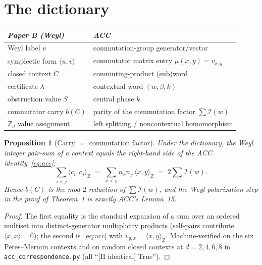\documentclass[11pt]{article}
\newtheorem{proposition}[theorem]{Proposition}
\newcommand{\Z}{\mathbb{Z}}
\newcommand{\ip}[2]{\langle #1,#2\rangle}
\begin{document}
\section{The dictionary}
\begin{center}
\begin{tabular}{ll}
\hline
\emph{Paper B (Weyl)} & \emph{ACC~\cite{ACC24}}\\
\hline
Weyl label $v$ & commutation-group generator/vector\\
symplectic form $\ip{u}{v}$ & commutator matrix entry $\mu(x,y)=v_{x,y}$\\
closed context $C$ & commuting-product (sub)word\\
certificate $\lambda$ & contextual word $(w,\beta,k)$\\
obstruction value $S$ & central phase $k$\\
commutator carry $b(C)$ & parity of the commutation factor $\sum\mathcal I(w)$\\
$\Z_d$ value assignment & left splitting / noncontextual homomorphism\\
\hline
\end{tabular}
\end{center}

\begin{proposition}[Carry $=$ commutation factor]\label{prop:carry}
Under the dictionary, the Weyl integer pair-sum of a context equals the right-hand side of the ACC
identity~\eqref{eq:acc}:
\[
\sum_{i<j}\ip{c_i}{c_j}_{\Z}\;=\;\sum_{x<y}n_x n_y\,\ip{x}{y}_{\Z}\;=\;2\sum\mathcal I(w).
\]
Hence $b(C)$ is the mod-$2$ reduction of $\sum\mathcal I(w)$, and the Weyl polarization step in the
proof of Theorem~1 is exactly ACC's Lemma~15.
\end{proposition}
\begin{proof}
The first equality is the standard expansion of a sum over an ordered multiset into distinct-generator
multiplicity products (self-pairs contribute $\ip{x}{x}=0$); the second is~\eqref{eq:acc} with
$v_{y,x}=\ip{x}{y}_{\Z}$. Machine-verified on the six Peres--Mermin contexts and on random closed
contexts at $d=2,4,6,8$ in \texttt{acc\_correspondence.py} (all ``[II identical] True'').
\end{proof}
\end{document}
